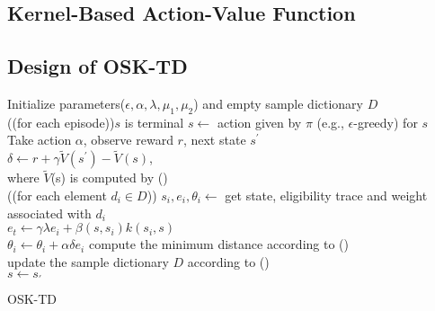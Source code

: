 \documentclass[conference]{IEEEtran}
\makeatletter
\newcommand{\removelatexerror}{\let\@latex@error\@gobble}
\newcommand{\dosemic}{\renewcommand{\@endalgocfline}{\algocf@endline}}%
\let\oldnl\nl%
\newcommand{\nonl}{\renewcommand{\nl}{\let\nl\oldnl}}%
\makeatother
\begin{document}
\subsection{Kernel-Based Action-Value Function}
\subsection{Design of OSK-TD}
{
	\removelatexerror%
	\LinesNumbered
	\begin{algorithm}[H]
		\textup{Initialize parameters($\epsilon, \alpha,\lambda, \mu_1, \mu_2$) and empty sample dictionary $D$}\\

		\Repeat({(for each episode)}){$s$ is terminal}{
	  		$s\leftarrow$ action given by $\pi$ (e.g., $\epsilon$-greedy) for $s$\\
	  		Take action $\alpha$, observe reward $r$, next state $s^{'}$\\
	  		$\delta \leftarrow r+\gamma\tilde{V}(s^{'})-\tilde{V}(s)$,\\
	  		\dosemic\nonl where $\tilde{V}$(s) is computed by ()\\
  		
  			\Repeat({(for each element $d_i\in D$)}){}{
	  			$s_i, e_i, \theta_i \leftarrow$ get state, eligibility trace and weight associated with $d_i$\\
	  			$e_t\leftarrow \gamma\lambda e_i+\beta(s, s_i)k(s_i, s)$\\
	  			$\theta_i \leftarrow \theta_i + \alpha\delta e_i$
  			}
  			compute the minimum distance according to ()\\
  			update the sample dictionary $D$ according to ()\\
  			$s\leftarrow s_{'}$
  		}
 		\caption{OSK-TD}
	\end{algorithm}
}


%
%
\end{document}
